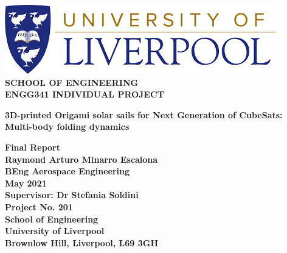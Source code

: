 \begin{titlepage}
   \begin{center}
       \large
        \includegraphics[scale=0.4]{logo}
       \\
       \vspace{0.5cm}
        \textbf{SCHOOL OF ENGINEERING} \\

        \textbf{ENGG341 INDIVIDUAL PROJECT}
        
        
            
       \vspace{1.5cm}

 
       \vspace{1.5cm}
       \textbf{\Large{3D-printed Origami solar sails for Next Generation of CubeSats: Multi-body folding dynamics}}\\
       \normalsize
       
      \large{\textbf{Final Report}}\\
      
       \vspace{1cm}
      \Large{\textbf{Raymond Arturo Minarro Escalona}}\\
       \large{\textbf{BEng Aerospace Engineering\\May 2021}}\\
        \vspace{1cm}
      \Large{\textbf{Supervisor: Dr Stefania Soldini}}\\
      \large{\textbf{Project No. 201}}\\
      
      

       \vfill
        \textbf{
        \large
       School of Engineering
            \\
        University of Liverpool 
        \\
        Brownlow Hill, Liverpool, L69 3GH
        }
       \vspace{0.8cm}

       \normalsize
   \end{center}
\end{titlepage}

